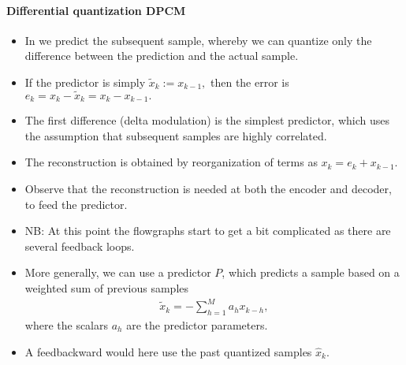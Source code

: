 \documentclass[letterpaper,10pt,english]{jupyterBook}
\begin{document}
\paragraph{Differential quantization DPCM}
\label{\detokenize{Representations/Waveform:differential-quantization-dpcm}}\begin{itemize}
\item {} 
\sphinxAtStartPar
In  we predict the subsequent sample,
whereby we can quantize only the difference between the prediction
and the actual sample.

\item {} 
\sphinxAtStartPar
If the predictor is simply \( \tilde x_k:=x_{k-1}, \) then the error is \( e_k = x_k - \tilde x_k = x_k - x_{k-1}. \)

\item {} 
\sphinxAtStartPar
The first difference (delta modulation) is the simplest  predictor, which uses the assumption that subsequent samples are highly correlated.

\item {} 
\sphinxAtStartPar
The reconstruction is obtained by reorganization of terms as \( x_k = e_k + x_{k-1}. \)

\item {} 
\sphinxAtStartPar
Observe that the reconstruction is needed at both the encoder and decoder, to feed the predictor.

\item {} 
\sphinxAtStartPar
NB: At this point the flow\sphinxhyphen{}graphs start to get a bit complicated         as there are several feedback loops.

\item {} 
\sphinxAtStartPar
More generally, we can use a predictor \(P\), which predicts a sample
based on a weighted sum of previous samples
\begin{equation*}
\begin{split}
    \tilde x_k = -\sum_{h=1}^M a_h x_{k-h}, 
    \end{split}
\end{equation*}
\sphinxAtStartPar
where the scalars  \( a_h \)  are the predictor parameters.

\item {} 
\sphinxAtStartPar
A feed\sphinxhyphen{}backward would here use the past quantized samples \( \hat
x_k. \)

\end{itemize}

\sphinxAtStartPar
{}
\end{document}
